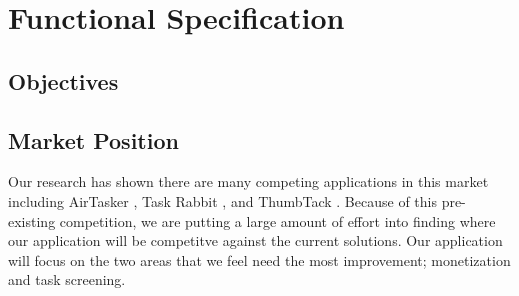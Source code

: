 \documentclass[11pt]{article}
\begin{document}


%
\section{Functional Specification}\label{functional-spec}



\subsection{Objectives}


\subsection{Market Position}

Our research has shown there are many competing applications in this market including AirTasker \cite{AirTasker}, Task Rabbit \cite{TaskRabbit}, and ThumbTack \cite{ThumbTack}. 
Because of this pre-existing competition, we are putting a large amount of effort into finding where our application will be competitve against the current solutions. 
Our application will focus on the two areas that we feel need the most improvement; monetization and task screening.
\end{document}
